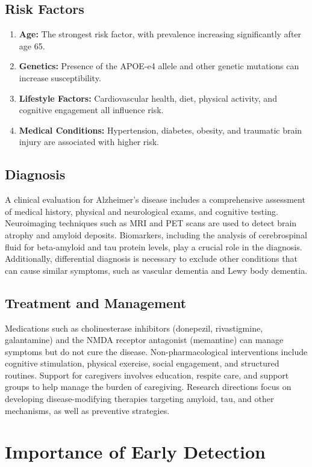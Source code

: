 \documentclass[a4paper,12pt]{report}
\begin{document}
    \subsection{Risk Factors}
\begin{enumerate}
    \item\textbf{Age:} The strongest risk factor, with prevalence increasing significantly after age 65.
    \item\textbf{Genetics:} Presence of the APOE-e4 allele and other genetic mutations can increase susceptibility.
    \item\textbf{Lifestyle Factors:} Cardiovascular health, diet, physical activity, and cognitive engagement all influence risk.
    \item\textbf{Medical Conditions:} Hypertension, diabetes, obesity, and traumatic brain injury are associated with higher risk.
 \end{enumerate}

    \subsection{Diagnosis}
A clinical evaluation for Alzheimer's disease includes a comprehensive assessment of medical history, physical and neurological exams, and cognitive testing. Neuroimaging techniques such as MRI and PET scans are used to detect brain atrophy and amyloid deposits. Biomarkers, including the analysis of cerebrospinal fluid for beta-amyloid and tau protein levels, play a crucial role in the diagnosis. Additionally, differential diagnosis is necessary to exclude other conditions that can cause similar symptoms, such as vascular dementia and Lewy body dementia.

    \subsection{Treatment and Management}
Medications such as cholinesterase inhibitors (donepezil, rivastigmine, galantamine) and the NMDA receptor antagonist (memantine) can manage symptoms but do not cure the disease. Non-pharmacological interventions include cognitive stimulation, physical exercise, social engagement, and structured routines. Support for caregivers involves education, respite care, and support groups to help manage the burden of caregiving. Research directions focus on developing disease-modifying therapies targeting amyloid, tau, and other mechanisms, as well as preventive strategies.
 \section{Importance of Early Detection}
\end{document}
